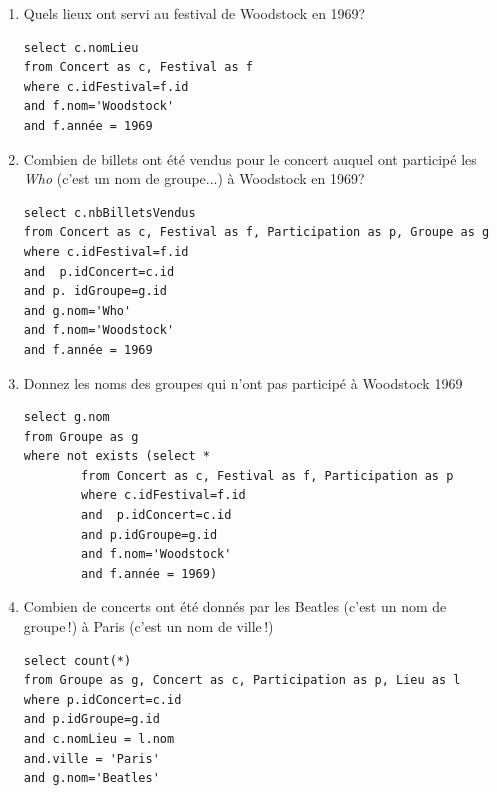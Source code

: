 \begin{enumerate}

\item Quels lieux ont servi au festival de Woodstock en 1969?

\begin{solution}
\begin{verbatim}
select c.nomLieu
from Concert as c, Festival as f
where c.idFestival=f.id
and f.nom='Woodstock'
and f.année = 1969
\end{verbatim}
\end{solution}

\item Combien de billets ont été vendus pour le concert auquel ont participé les \textit{Who}
(c'est un nom de groupe...) à Woodstock en 1969?

\begin{solution}
\begin{verbatim}
select c.nbBilletsVendus
from Concert as c, Festival as f, Participation as p, Groupe as g
where c.idFestival=f.id
and  p.idConcert=c.id
and p. idGroupe=g.id
and g.nom='Who'
and f.nom='Woodstock'
and f.année = 1969
\end{verbatim}
\end{solution}

\item Donnez les noms des groupes qui n'ont pas participé à Woodstock 1969

\begin{solution}
\begin{verbatim}
select g.nom
from Groupe as g
where not exists (select *
        from Concert as c, Festival as f, Participation as p
        where c.idFestival=f.id
        and  p.idConcert=c.id
        and p.idGroupe=g.id
        and f.nom='Woodstock'
        and f.année = 1969)
\end{verbatim}
\end{solution}


\item Combien de concerts ont été donnés par les Beatles  
(c'est un nom de groupe\,!) à Paris
(c'est un nom de ville\,!)

\begin{solution}
\begin{verbatim}
select count(*)
from Groupe as g, Concert as c, Participation as p, Lieu as l
where p.idConcert=c.id
and p.idGroupe=g.id
and c.nomLieu = l.nom
and.ville = 'Paris'
and g.nom='Beatles'
\end{verbatim}
\end{solution}


\end{enumerate}
